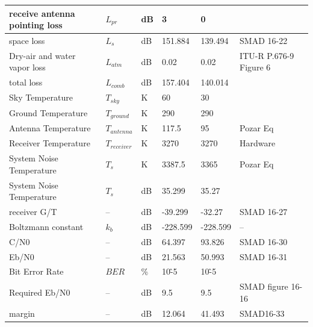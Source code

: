 \documentclass[12pt]{article}
\begin{document}
\begin{center}
\begin{longtable}{| p{3.9cm} | p{1.6cm} | p{1.4cm} | p{1.4cm} | p{1.4cm} | p{5cm} |}
    receive antenna pointing loss & $L_{pr}$ & dB    & 3     & 0     &  \\\hline
    space loss & $L_s$  & dB    & 151.884 & 139.494 & SMAD 16-22 \\\hline
    Dry-air and water vapor loss & $L_{atm}$ & dB    & 0.02  & 0.02  & ITU-R P.676-9 Figure 6 \\\hline
    total loss & $L_{comb}$ & dB    & 157.404 & 140.014 &  \\\hline
    Sky Temperature & $T_{sky}$ & K     & 60    & 30    &  \\\hline
    Ground Temperature & $T_{ground}$ & K     & 290   & 290   &  \\\hline
    Antenna Temperature & $T_{antenna}$ & K     & 117.5 & 95    & Pozar Eq \\\hline
    Receiver Temperature & $T_{receiver}$ & K     & 3270  & 3270  & Hardware \\\hline
    System Noise Temperature & $T_s$  & K     & 3387.5 & 3365  & Pozar Eq \\\hline
    System Noise Temperature & $T_s$  & dB    & 35.299 & 35.27 &  \\\hline
    receiver G/T & --    & dB    & -39.299 & -32.27 & SMAD 16-27 \\\hline
    Boltzmann constant & $k_b$  & dB    & -228.599 & -228.599 & -- \\\hline
    C/N0  & --    & dB    & 64.397 & 93.826 & SMAD 16-30 \\\hline
    Eb/N0 & --    & dB    & 21.563 & 50.993 & SMAD 16-31 \\\hline
    Bit Error Rate & $BER$   & \%    & 10\^-5 & 10\^-5 &  \\\hline
    Required Eb/N0 & --    & dB    & 9.5   & 9.5   & SMAD figure 16-16 \\\hline
    margin & --    & dB    & 12.064 & 41.493 & SMAD16-33 \\
\hline
\end{longtable}
\end{center}


\newpage
\end{document}
